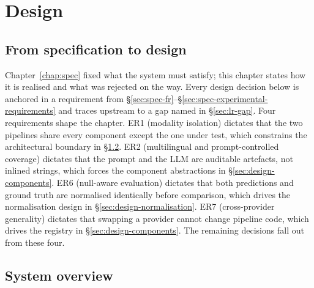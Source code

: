
\chapter{Design}
\label{chap:design}

\section{From specification to design}
\label{sec:design-bridge}

Chapter~\ref{chap:spec} fixed what the system must satisfy;
this chapter states how it is realised and what was rejected on the
way. Every design decision below is anchored in a requirement from
\S\ref{sec:spec-fr}--\S\ref{sec:spec-experimental-requirements} and
traces upstream to a gap named in \S\ref{sec:lr-gap}. Four
requirements shape the chapter. ER1 (modality isolation) dictates
that the two pipelines share every component except the one under
test, which constrains the architectural boundary in \S\ref{sec:design-overview}. ER2 (multilingual and prompt-controlled
coverage) dictates that the prompt and the LLM are auditable
artefacts, not inlined strings, which forces the component
abstractions in \S\ref{sec:design-components}. ER6 (null-aware
evaluation) dictates that both predictions and ground truth are
normalised identically before comparison, which drives the
normalisation design in \S\ref{sec:design-normalisation}. ER7
(cross-provider generality) dictates that swapping a provider cannot
change pipeline code, which drives the registry in
\S\ref{sec:design-components}. The remaining decisions fall out from
these four.

\section{System overview}
\label{sec:design-overview}

